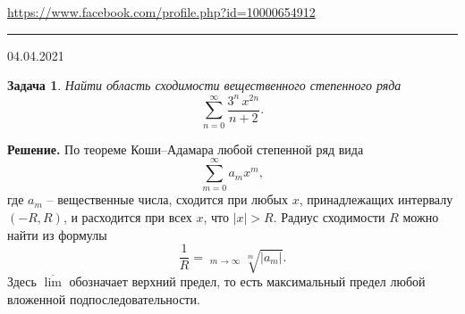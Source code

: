 \documentclass[12pt]{article}
\DeclareMathOperator*\uplim{\overline{lim}}
\begin{document}


\begin{flushleft}
\url{https://www.facebook.com/profile.php?id=10000654912}
\end{flushleft}
\hrule 
\begin{flushright}
04.04.2021
\end{flushright}
\bigskip


\newtheorem*{task}{Задача}
\begin{task}
Найти область сходимости вещественного степенного ряда
\begin{equation} \label{series}
    \sum\limits_{n=0}^{\infty} \frac{3^n\, x^{2n}}{n+2}.
\end{equation}
\end{task}

\noindent\textbf{Решение.} По теореме Коши--Адамара любой степенной ряд вида 
\begin{equation*}
    \sum\limits_{m=0}^{\infty} a_m x^m,
\end{equation*}
где $a_m$ -- вещественные числа, сходится при любых $x$, принадлежащих интервалу $(-R, R)$, и расходится при всех $x$, что $|x| > R$. Радиус сходимости $R$ можно найти из формулы
\begin{equation}\label{radius}
    \frac{1}{R} = \uplim_{m\to\infty} \sqrt[m]{|a_m|}.
\end{equation}
Здесь $\overline{\lim}$ обозначает верхний предел, то есть максимальный предел любой вложенной подпоследовательности.
\end{document}
